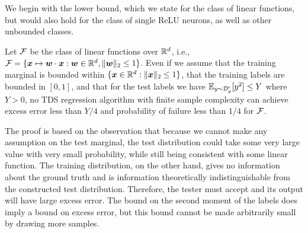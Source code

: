 We begin with the lower bound, which we state for the class of linear functions, but would also hold for the class of single ReLU neurons, as well as other unbounded classes.

\begin{proposition}\label{proposition:bounded-labels-necessary}
    Let ${\mathcal{F}}$ be the class of linear functions over $\mathbb{R}^d$, i.e., ${\mathcal{F}} = \{{\bm{x}}\mapsto {\bm{w}}\cdot {\bm{x}}: {\bm{w}}\in\mathbb{R}^d, \|{\bm{w}}\|_2 \le 1\}$. Even if we assume that the training marginal is bounded within $\{{\bm{x}}\in\mathbb{R}^d: \|{\bm{x}}\|_2\le 1\}$, that the training labels are bounded in $[0,1]$, and that for the test labels we have $\mathbb{E}_{y\sim {\mathcal{D}}'_y}[y^2] \le Y$ where $Y>0$, no TDS regression algorithm with finite sample complexity can achieve excess error less than $Y/4$ and probability of failure less than $1/4$ for ${\mathcal{F}}$.
\end{proposition}

The proof is based on the observation that because we cannot make any assumption on the test marginal, the test distribution could take some very large value with very small probability, while still being consistent with some linear function. The training distribution, on the other hand, gives no information about the ground truth and is information theoretically indistinguishable from the constructed test distribution. Therefore, the tester must accept and its output will have large excess error. The bound on the second moment of the labels does imply a bound on excess error, but this bound cannot be made arbitrarily small by drawing more samples.



